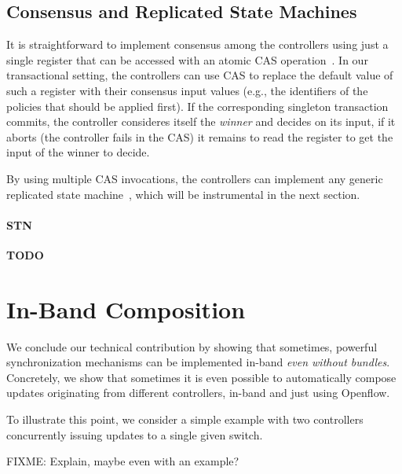 \documentclass[conference]{sigcomm-alternate}
\begin{document}
\subsection{Consensus and Replicated State Machines}

It is straightforward to implement consensus among the controllers
using just a single register that can be accessed with an atomic CAS
operation~\cite{Her91}. In our transactional setting, the controllers
can use CAS to replace the default value of such a register 
with their consensus input values (e.g., the identifiers of the
policies that should be applied first). If the corresponding
singleton transaction commits, the controller consideres itself 
the \emph{winner} and decides on its input, if
it aborts (the controller fails in the CAS) it remains to read the register to get the input of the
winner to decide.    

By using multiple CAS invocations, the controllers can implement any
generic replicated state machine~\cite{Her91,Lam98}, which will be instrumental in the
next section. 


\paragraph{STN} 

\textbf{TODO}

\section{In-Band Composition}\label{sec:compo}

We conclude our technical contribution by showing that sometimes,
powerful synchronization mechanisms can be implemented
in-band \emph{even without bundles}.
Concretely, we show that sometimes it is even possible
to automatically compose updates originating from different controllers,
in-band and just using Openflow.

To illustrate this point, we consider a simple example
with two controllers concurrently issuing updates to a single
given switch.

FIXME: Explain, maybe even with an example?
\end{document}
